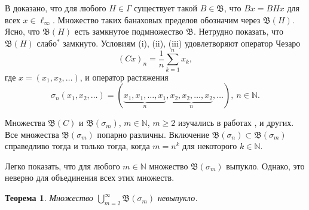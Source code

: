 \documentclass[12pt]{article}
\newtheorem{thm}{Теорема}
\newtheorem{prop}[thm]{Утверждение}
\def\N{{\mathbb{N}}}
\def\B{{\mathfrak{B}}}
\begin{document}
В \cite{SS_JFA} доказано, что для любого $H\in \Gamma$ существует такой $B\in\B$, что  $Bx=BHx$ для всех $x\in \ell_\infty$. Множество таких банаховых пределов обозначим через $\B(H)$. Ясно, что $\B(H)$ есть замкнутое  подмножество $\B$. Нетрудно показать, что $\B(H)$ слабо$^*$ замкнуто. Условиям (i), (ii), (iii) удовлетворяют оператор Чезаро
\begin{equation}\label{cesaro}
(Cx)_n=\frac1n\sum_{k=1}^n x_k,
\end{equation}
где $x=(x_1, x_2, \dots)$,
и оператор растяжения
$$\sigma_n(x_1, x_2, \dots)=(\underbrace{x_1, x_1, \dots, x_1}_{n}, \underbrace{x_2, x_2, \dots, x_2}_{n}, \dots), \ n\in\N.$$

Множества $\B(C)$ и $\mathfrak B(\sigma_m)$, $m\in \N$, $m\ge 2$ изучались в работах \cite{SS_JFA}, \cite{ASSU2} и других. Все множества $\mathfrak B(\sigma_m)$ попарно различны. Включение $\mathfrak B(\sigma_n) \subset \mathfrak B(\sigma_m)$ справедливо тогда и только тогда, когда $m=n^k$ для некоторого $k\in \N$.


%
%
%

Легко показать, что для любого $m\in \N$ множество $\mathfrak B(\sigma_m)$ выпукло. Однако, это неверно для объединения всех этих множеств.

 \begin{thm}
  Множество $\bigcup_{m=2}^\infty\mathfrak B(\sigma_m)$ невыпукло.
 \end{thm}
\end{document}
